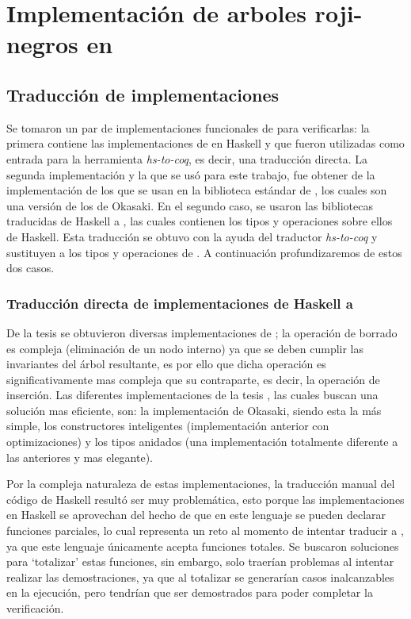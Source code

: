\chapter{Implementación de arboles roji-negros en {\coq}}

\section{Traducción de implementaciones}
Se tomaron un par de implementaciones funcionales de {\arns} para verificarlas: la primera contiene 
las implementaciones de \cite{tesisG} en Haskell y que fueron utilizadas como entrada para la 
herramienta \textit{hs-to-coq}, es decir, una traducci\'on directa. La segunda implementaci\'on y la 
que se us\'o para este trabajo, fue obtener de \cite{MSetRBT} la implementaci\'on de los {\arns} que 
se usan en la biblioteca estándar de {\coq}, los cuales son una versi\'on de los {\arns} de 
Okasaki\cite{Okasaki}. En el segundo caso, se usaron las bibliotecas traducidas de Haskell a {\coq}, 
las cuales contienen los tipos y operaciones sobre ellos de Haskell. Esta traducción se obtuvo con 
la ayuda del traductor \textit{hs-to-coq} y sustituyen a los tipos y operaciones de {\coq}. A 
continuación profundizaremos de estos  dos casos.

\subsection{Traducción directa de implementaciones de Haskell a {\coq}}
De la tesis \cite{tesisG} se obtuvieron diversas implementaciones de {\arns}; la operaci\'on de 
borrado es compleja (eliminaci\'on de un nodo interno) ya que se deben cumplir las invariantes del 
\'arbol resultante, es por ello que dicha operación es significativamente mas compleja que su 
contraparte, es decir, la operación de inserci\'on. Las diferentes implementaciones de la tesis 
\cite{tesisG}, las cuales buscan una soluci\'on mas eficiente, son: la implementación de Okasaki, 
siendo esta la m\'as simple, los constructores inteligentes (implementaci\'on anterior con 
optimizaciones) y los tipos anidados (una implementaci\'on totalmente diferente a las anteriores y 
mas elegante).

Por la compleja naturaleza de estas implementaciones, la traducción
manual del código de Haskell result\'o ser muy problemática, esto porque las implementaciones en
Haskell se aprovechan del hecho de que en este lenguaje se pueden declarar funciones parciales, lo
cual representa un reto al momento de intentar traducir a {\coq}, ya que este lenguaje únicamente 
acepta funciones totales. Se buscaron soluciones para `totalizar' estas funciones, sin embargo,
solo traerían problemas al intentar realizar las demostraciones, ya que al totalizar se generar\'ian 
casos inalcanzables en la ejecuci\'on, pero tendrían que ser demostrados para poder completar la 
verificaci\'on.

